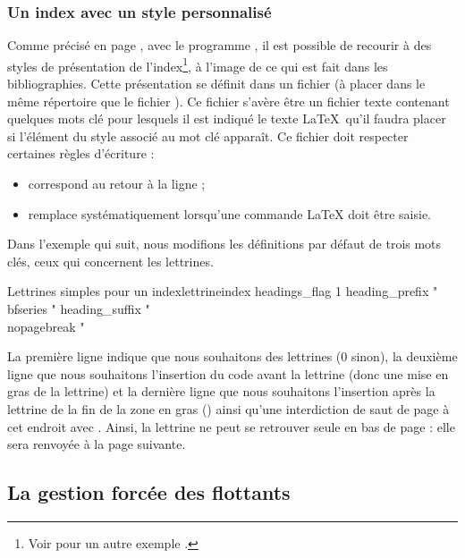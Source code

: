 \subsubsection{Un index avec un style personnalisé}

Comme précisé en page \pageref{styleindex}, avec le programme , il est possible de recourir à des styles de présentation de l'index\footnote{Voir  pour un autre exemple \cite{atan}.}, à l'image de ce qui est fait dans les bibliographies. Cette présentation se définit dans un fichier  (à placer dans le même répertoire que le fichier ). Ce fichier s'avère être un fichier texte contenant quelques mots clé pour lesquels il est indiqué le texte \LaTeX\ qu'il faudra placer si l'élément du style associé au mot clé apparaît. Ce fichier doit respecter certaines règles d'écriture :
\begin{itemize}
\item {} correspond au retour à la ligne ;
\item \macro{\ba} remplace systématiquement \macro{} lorsqu'une commande \LaTeX{} doit être saisie.
\end{itemize}

Dans l'exemple qui suit, nous modifions les définitions par défaut de trois mots clés, ceux qui concernent les lettrines.

\begin{codesimple}{Lettrines simples pour un index}{lettrineindex}
headings_flag 1
heading_prefix "{\\bfseries "
heading_suffix "}\\nopagebreak \n"
\end{codesimple}


La première ligne indique que nous souhaitons des lettrines (0 sinon), la deuxième ligne que nous souhaitons l'insertion du code \macron{\{} avant la lettrine (donc une mise en gras de la lettrine) et la dernière ligne que nous souhaitons l'insertion après la lettrine de la fin de la zone en gras (\macron{\}}) ainsi qu'une interdiction de saut de page à cet endroit avec . Ainsi, la lettrine ne peut se retrouver seule en bas de page : elle sera renvoyée à la page suivante. 


\subsection{La gestion forcée des flottants} 

